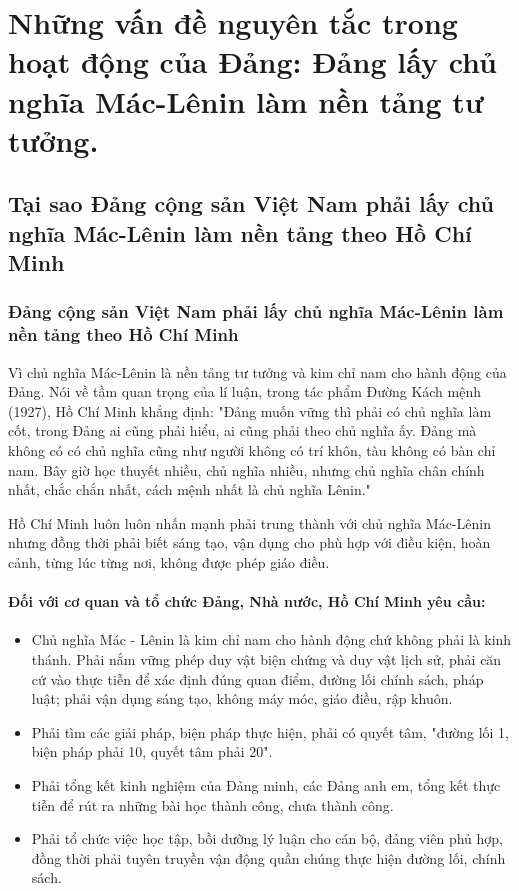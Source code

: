 \section{Những vấn đề nguyên tắc trong hoạt động của Đảng: Đảng lấy chủ nghĩa Mác-Lênin làm nền tảng tư tưởng.}

\subsection{Tại sao Đảng cộng sản Việt Nam phải lấy chủ nghĩa Mác-Lênin làm nền tảng theo Hồ Chí Minh}

\subsubsection{Đảng cộng sản Việt Nam phải lấy chủ nghĩa Mác-Lênin làm nền tảng theo Hồ Chí Minh}

Vì chủ nghĩa Mác-Lênin là nền tảng tư tưởng và kim chỉ nam cho hành động của Đảng. Nói về tầm quan trọng của lí luận, trong tác phẩm Đường Kách mệnh (1927), Hồ Chí Minh khẳng định: "Đảng muốn vững thì phải có chủ nghĩa làm cốt, trong Đảng ai cũng phải hiểu, ai cũng phải theo chủ nghĩa ấy. Đảng mà không có có chủ nghĩa cũng như người không có trí khôn, tàu không có bàn chỉ nam. Bây giờ học thuyết nhiều, chủ nghĩa nhiều, nhưng chủ nghĩa chân chính nhất, chắc chắn nhất, cách mệnh nhất là chủ nghĩa Lênin."

Hồ Chí Minh luôn luôn nhấn mạnh phải trung thành với chủ nghĩa Mác-Lênin nhưng đồng thời phải biết sáng tạo, vận dụng cho phù hợp với điều kiện, hoàn cảnh, từng lúc từng nơi, không được phép giáo điều.

\paragraph{Đối với cơ quan và tổ chức Đảng, Nhà nước, Hồ Chí Minh yêu cầu:}
\begin{itemize}
    \item Chủ nghĩa Mác - Lênin là kim chỉ nam cho hành động chứ không phải là kinh thánh. Phải nắm vững phép duy vật biện chứng và duy vật lịch sử, phải căn cứ vào thực tiễn để xác định đúng quan điểm, đường lối chính sách, pháp luật; phải vận dụng sáng tạo, không máy móc, giáo điều, rập khuôn.
    \item Phải tìm các giải pháp, biện pháp thực hiện, phải có quyết tâm, "đường lối 1, biện pháp phải 10, quyết tâm phải 20".
    \item Phải tổng kết kinh nghiệm của Đảng minh, các Đảng anh em, tổng kết thực tiễn để rút ra những bài học thành công, chưa thành công.
    \item Phải tổ chức việc học tập, bồi dưỡng lý luận cho cán bộ, đảng viên phủ hợp, đồng thời phải tuyên truyền vận động quần chúng thực hiện đường lối, chính sách.
\end{itemize}


